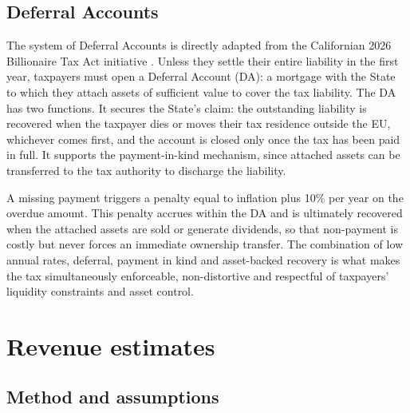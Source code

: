 \documentclass[../../main]{subfiles}
\begin{document}
\subsection{Deferral Accounts} %

The system of Deferral Accounts is directly adapted from the Californian 2026 Billionaire Tax Act initiative \citep{CABillionaireTax2026}. 
Unless they settle their entire liability in the first year, taxpayers must open a Deferral Account (DA): a mortgage %
with the State to which they attach assets of sufficient value to cover the tax liability. The DA has two functions. It secures the State's claim: the outstanding liability is recovered when the taxpayer dies or moves their tax residence outside the EU, whichever comes first, and the account is closed only once the tax has been paid in full. It supports the payment-in-kind mechanism, since attached assets can be transferred to the tax authority to discharge the liability. %

A missing payment triggers a penalty equal to inflation plus 10\% per year on the overdue amount. This penalty accrues within the DA and is ultimately recovered when the attached assets are sold or generate dividends, so that non-payment is costly but never forces an immediate ownership transfer. The combination of low annual rates, deferral, payment in kind and asset-backed recovery is what makes the tax simultaneously enforceable, non-distortive and respectful of taxpayers' liquidity constraints and asset control.

\section{Revenue estimates}
\label{sec:revenue}

\subsection{Method and assumptions}
\end{document}
